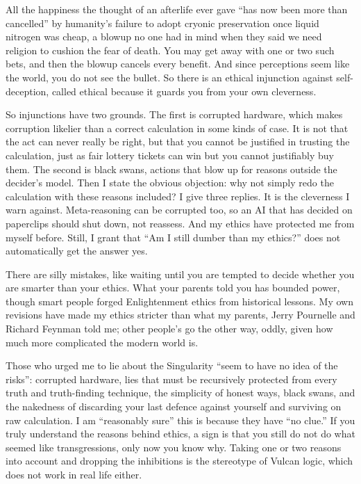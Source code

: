 All the happiness the thought of an afterlife ever gave ``has now been more than cancelled'' by humanity's failure to adopt cryonic preservation once liquid nitrogen was cheap, a blowup no one had in mind when they said we need religion to cushion the fear of death. You may get away with one or two such bets, and then the blowup cancels every benefit. And since perceptions seem like the world, you do not see the bullet. So there is an ethical injunction against self-deception, called ethical because it guards you from your own cleverness. 

So injunctions have two grounds. The first is corrupted hardware, which makes corruption likelier than a correct calculation in some kinds of case. It is not that the act can never really be right, but that you cannot be justified in trusting the calculation, just as fair lottery tickets can win but you cannot justifiably buy them. The second is black swans, actions that blow up for reasons outside the decider's model. Then I state the obvious objection: why not simply redo the calculation with these reasons included?  I give three replies. It is the cleverness I warn against. Meta-reasoning can be corrupted too, so an AI that has decided on paperclips should shut down, not reassess. And my ethics have protected me from myself before.  Still, I grant that ``Am I still dumber than my ethics?'' does not automatically get the answer yes.

There are silly mistakes, like waiting until you are tempted to decide whether you are smarter than your ethics. What your parents told you has bounded power, though smart people forged Enlightenment ethics from historical lessons. My own revisions have made my ethics stricter than what my parents, Jerry Pournelle and Richard Feynman told me; other people's go the other way, oddly, given how much more complicated the modern world is.

Those who urged me to lie about the Singularity ``seem to have no idea of the risks'': corrupted hardware, lies that must be recursively protected from every truth and truth-finding technique, the simplicity of honest ways, black swans, and the nakedness of discarding your last defence against yourself and surviving on raw calculation. I am ``reasonably sure'' this is because they have ``no clue.'' If you truly understand the reasons behind ethics, a sign is that you still do not do what seemed like transgressions, only now you know why. Taking one or two reasons into account and dropping the inhibitions is the stereotype of Vulcan logic, which does not work in real life either.

